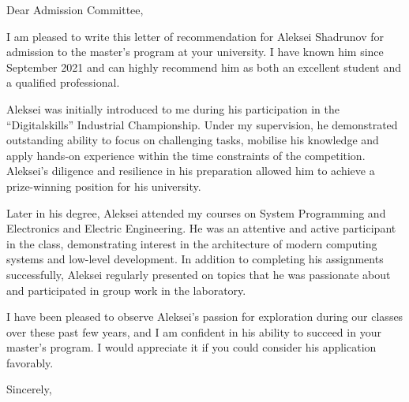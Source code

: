 \documentclass{letter}
\begin{document}
\signature{Yaroslav E. Mescheryakov \\ Associate Professor at the Department of Cyber-Physical Systems Information Security \\ HSE University \\ \url{ymeshcheryakov@hse.ru}}

\begin{letter}{}
\opening{Dear Admission Committee,}

I am pleased to write this letter of recommendation for Aleksei Shadrunov for admission to the master's program at your university. I have known him since September 2021 and can highly recommend him as both an excellent student and a qualified professional.

Aleksei was initially introduced to me during his participation in the “Digitalskills” Industrial Championship. Under my supervision, he demonstrated outstanding ability to focus on challenging tasks, mobilise his knowledge and apply hands-on experience within the time constraints of the competition. Aleksei's diligence and resilience in his preparation allowed him to achieve a prize-winning position for his university.

Later in his degree, Aleksei attended my courses on System Programming and Electronics and Electric Engineering. He was an attentive and active participant in the class, demonstrating interest in the architecture of modern computing systems and low-level development. In addition to completing his assignments successfully, Aleksei regularly presented on topics that he was passionate about and participated in group work in the laboratory.

I have been pleased to observe Aleksei's passion for exploration during our classes over these past few years, and I am confident in his ability to succeed in your master's program. I would appreciate it if you could consider his application favorably.

\closing{Sincerely,}


\end{letter}
\end{document}
